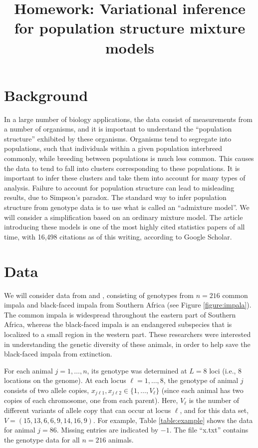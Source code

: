 \documentclass[12pt]{article}
\title{Homework: Variational inference for population structure mixture models}
\author{}
\date{}
\begin{document}
\maketitle

\thispagestyle{firststyle}


\vspace{2em}



\section{Background}

In a large number of biology applications, the data consist of measurements from a number of organisms, and it is important to understand the ``population structure'' exhibited by these organisms.  Organisms tend to segregate into populations, such that individuals within a given population interbreed commonly, while breeding between populations is much less common.  This causes the data to tend to fall into clusters corresponding to these populations. It is important to infer these clusters and take them into account for many types of analysis.  Failure to account for population structure can lead to misleading results, due to Simpson's paradox.
The standard way to infer population structure from genotype data is to use what is called an ``admixture model''.  We will consider a simplification based on an ordinary mixture model.  The article introducing these models \citep{pritchard2000inference} is one of the most highly cited statistics papers of all time, with 16,498 citations as of this writing, according to Google Scholar.


\section{Data}

We will consider data from \citet{lorenzen2004no} and \citet{lorenzen2006regional}, consisting of genotypes from $n = 216$ common impala and black-faced impala from Southern Africa (see Figure \ref{figure:impala}).  The common impala is widespread throughout the eastern part of Southern Africa, whereas the black-faced impala is an endangered subspecies that is localized to a small region in the western part. These researchers were interested in understanding the genetic diversity of these animals, in order to help save the black-faced impala from extinction.

For each animal $j = 1,\ldots,n$, its genotype was determined at $L = 8$ loci (i.e., $8$ locations on the genome). At each locus $\ell = 1,\ldots,8$, the genotype of animal $j$ consists of two allele copies, $x_{j \ell 1},x_{j \ell 2} \in \{1,\ldots,V_\ell \}$ (since each animal has two copies of each chromosome, one from each parent). Here, $V_\ell$ is the number of different variants of allele copy that can occur at locus $\ell$, and for this data set, $V = (15,13,6,6,9,14,16,9)$. For example, Table \ref{table:example} shows the data for animal $j = 86$. Missing entries are indicated by $-1$. The file ``x.txt'' contains the genotype data for all $n = 216$ animals.
\end{document}
